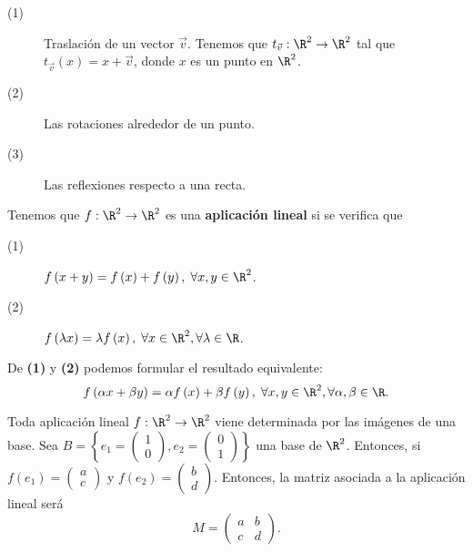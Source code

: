 \begin{eg}
\normalfont 
\begin{description}
\item[(1)] Traslación de un vector $\displaystyle \vec{v} $. Tenemos que $\displaystyle t_{\vec{v}} : \R^{2} \to \R^{2} $ tal que $\displaystyle t_{\vec{v}}\left(x\right) = x + \vec{v} $, donde $\displaystyle x $ es un punto en $\displaystyle \R^{2} $.
\item[(2)] Las rotaciones alrededor de un punto.
\item[(3)] Las reflexiones respecto a una recta.
\end{description}
\end{eg}

\begin{fdefinition}
\normalfont Tenemos que $\displaystyle f: \R^{2} \to \R^{2} $ es una \textbf{aplicación lineal} si se verifica que
\begin{description}
\item[(1)] $\displaystyle f\left(x + y\right) = f\left(x\right) + f\left(y\right), \; \forall x,y \in \R^{2} $.
\item[(2)] $\displaystyle f\left(\lambda x\right) = \lambda f\left(x\right), \; \forall x\in \R^{2}, \forall\lambda \in\R $.
\end{description}
\end{fdefinition}

\begin{observation}
\normalfont De \textbf{(1)} y \textbf{(2)} podemos formular el resultado equivalente:
\[f\left(\alpha x + \beta y\right) = \alpha f\left(x\right) + \beta f\left(y\right), \; \forall x,y \in \R^{2},\forall\alpha, \beta \in \R .\]
\end{observation}

\begin{observation}
	\normalfont Toda aplicación lineal $\displaystyle f: \R^{2} \to \R^{2} $ viene determinada por las imágenes de una base. Sea $\displaystyle B = \left\{e_{1} = \begin{pmatrix} 1 \\ 0 \end{pmatrix}, e_{2} = \begin{pmatrix} 0 \\ 1 \end{pmatrix}\right\}  $ una base de $\displaystyle \R^{2} $. Entonces, si $\displaystyle f\left(e_{1}\right) = \begin{pmatrix} a \\ c \end{pmatrix} $ y $\displaystyle f\left(e_{2}\right) = \begin{pmatrix} b \\ d \end{pmatrix} $. Entonces, la matriz asociada a la aplicación lineal será
	\[M = \begin{pmatrix} a & b \\ c & d\end{pmatrix} .\]
\end{observation}

